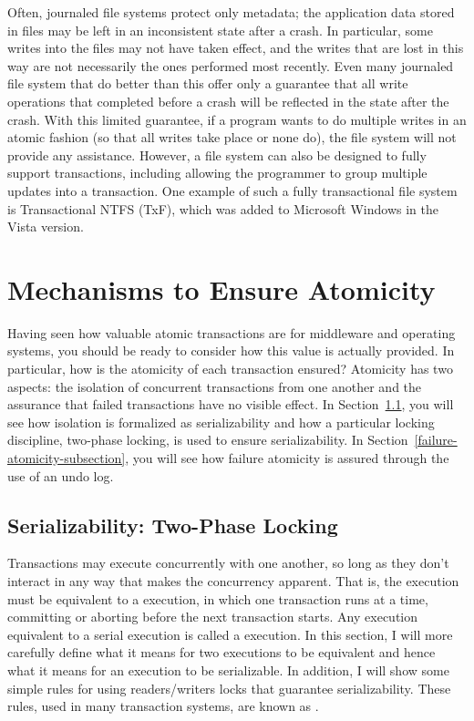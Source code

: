 Often, journaled file systems protect only metadata; the application
data stored in files may be left in an inconsistent state after a
crash.
In particular, some writes into the files may not have taken effect, and the writes that are lost in this way are not necessarily the ones performed most recently.
Even many journaled file system that do better than
this offer only a guarantee that all write operations
that completed before a crash will be reflected in the state after the
crash.  With this limited guarantee, if a program wants to do multiple writes in an atomic fashion
(so that all writes take place or none do), the file system will not
provide any assistance.  However, a file system can also be designed to
fully support transactions, including allowing the programmer to
group multiple updates into a transaction.  One example of such a fully
transactional file system is Transactional NTFS (TxF), which was added
to Microsoft Windows in the Vista version.

\section{Mechanisms to Ensure Atomicity}\label{atomicity-mechanisms-section}

Having seen how valuable atomic transactions are for middleware and
operating systems, you should be ready to consider how this value is
actually provided.  In particular, how is the atomicity of each
transaction ensured?  Atomicity has two aspects: the isolation of
concurrent transactions from one another and the assurance that
failed transactions have no visible effect.  In
Section~\ref{two-phase-section}, you will see how isolation is
formalized as serializability and how a particular locking discipline,
two-phase locking, is used to ensure serializability.  In
Section~\ref{failure-atomicity-subsection}, you will see how failure
atomicity is assured through the use of an undo log.

\subsection{Serializability: Two-Phase Locking}\label{two-phase-section}

Transactions may execute concurrently with one another, so long as
they don't interact in any way that makes the concurrency apparent.
That is, the execution must be equivalent to a 
execution, in which one transaction runs at a time, committing or
aborting before the next transaction starts.  Any execution
equivalent to a serial execution is called a  execution.  In
this section, I will more carefully define what it means for two
executions to be equivalent and hence what it means for an execution
to be serializable.  In addition, I will show some simple rules for using
readers/writers locks that guarantee serializability.  These rules,
used in many transaction systems, are known as
.

